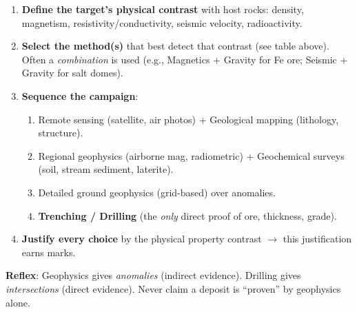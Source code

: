 \documentclass[11pt]{article}
\begin{document}
\begin{methode}
\begin{enumerate}
\item \textbf{Define the target's physical contrast} with host rocks: density, magnetism, resistivity/conductivity, seismic velocity, radioactivity.
\item \textbf{Select the method(s)} that best detect that contrast (see table above). Often a \emph{combination} is used (e.g., Magnetics + Gravity for Fe ore; Seismic + Gravity for salt domes).
\item \textbf{Sequence the campaign}:
\begin{enumerate}
\item Remote sensing (satellite, air photos) + Geological mapping (lithology, structure).
\item Regional geophysics (airborne mag, radiometric) + Geochemical surveys (soil, stream sediment, laterite).
\item Detailed ground geophysics (grid-based) over anomalies.
\item \textbf{Trenching / Drilling} (the \emph{only} direct proof of ore, thickness, grade).
\end{enumerate}
\item \textbf{Justify every choice} by the physical property contrast $\rightarrow$ this justification earns marks.
\end{enumerate}
\textbf{Reflex}: Geophysics gives \emph{anomalies} (indirect evidence). Drilling gives \emph{intersections} (direct evidence). Never claim a deposit is ``proven'' by geophysics alone.
\end{methode}
\end{document}
